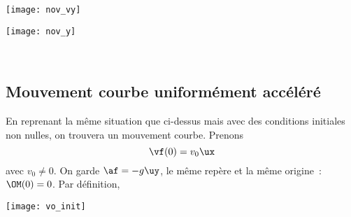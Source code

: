 \documentclass[../main/main.tex]{subfiles}
\begin{document}
\hfill
\begin{minipage}{0.45\linewidth}
    \begin{center}
        \texttt{[image: nov\_vy]}
    \end{center}
\end{minipage}
\hfill
\begin{minipage}{0.45\linewidth}
    \begin{center}
        \texttt{[image: nov\_y]}
    \end{center}
\end{minipage}
\hfill~

\subsection{Mouvement courbe uniformément accéléré}
\begin{minipage}{0.75\linewidth}
    En reprenant la même situation que ci-dessus mais avec des conditions
    initiales non nulles, on trouvera un mouvement courbe. Prenons
    \[\vf(0) = v_0\ux\]
    avec $v_0 \neq 0$. On garde $\af = -g \uy$, le même repère et la même
    origine~: $\OM(0) = 0$. Par définition,
\end{minipage}
\hfill
\begin{minipage}{0.23\linewidth}
    \begin{center}
        \texttt{[image: vo\_init]}
    \end{center}
\end{minipage}
\end{document}
